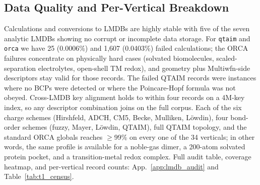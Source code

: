 \subsection{Data Quality and Per-Vertical Breakdown}
\label{sec:dataset-quality}

Calculations and conversions to LMDBs are highly stable with five of the
seven analytic LMDBs showing no corrupt or incomplete data storage. 
For \texttt{qtaim} and \texttt{orca} we have 25 (0.0006\%) and 1{,}607 (0.0403\%)
failed calculations; the ORCA failures concentrate on physically
hard cases (solvated biomolecules, scaled-separation electrolytes,
open-shell TM redox), and geometry plus Multiwfn-side descriptors stay
valid for those records. The failed QTAIM records were instances where
no BCPs were detected or where the Poincare-Hopf formula was not obeyed.
Cross-LMDB key alignment holds to within four
records on a 4M-key index, so any descriptor combination joins on
the full corpus. Each of the six charge schemes (Hirshfeld, ADCH, CM5,
Becke, Mulliken, L\"owdin), four bond-order schemes (fuzzy,
Mayer, L\"owdin, QTAIM), full QTAIM topology, and the standard ORCA globals
reaches $\geq$99\% on every one of the 34 verticals; in other words, the same
profile is available for a noble-gas dimer, a 200-atom solvated protein
pocket, and a transition-metal redox complex. Full audit
table, coverage heatmap, and per-vertical record counts:
App.~\ref{app:lmdb_audit} and Table~\ref{tab:t1_census}.

